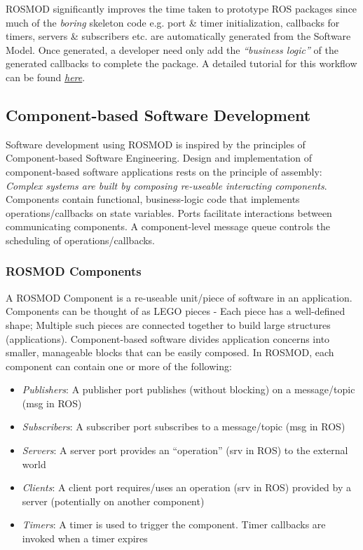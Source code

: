 \documentclass[letterpaper,10pt,english]{sphinxmanual}
\begin{document}
ROSMOD significantly improves the time taken to prototype ROS packages since much of the \emph{boring} skeleton code e.g. port \& timer initialization, callbacks for timers, servers \& subscribers etc. are automatically generated from the Software Model. Once generated, a developer need only add the \emph{``business logic''} of the generated callbacks to complete the package. A detailed tutorial for this workflow can be found {\hyperref[Tutorial:id1]{\emph{here}}}.


\subsection{Component-based Software Development}
\label{Introduction:component-based-software-development}
Software development using ROSMOD is inspired by the principles of Component-based Software Engineering. Design and implementation of component-based software applications rests on the principle of assembly: \emph{Complex systems are built by composing re-useable interacting components}. Components contain functional, business-logic code that implements operations/callbacks on state variables. Ports facilitate interactions between communicating components. A component-level message queue controls the scheduling of operations/callbacks.


\subsubsection{ROSMOD Components}
\label{Introduction:rosmod-components}
A ROSMOD Component is a re-useable unit/piece of software in an application. Components can be thought of as LEGO pieces - Each piece has a well-defined shape; Multiple such pieces are connected together to build large structures (applications). Component-based software divides application concerns into smaller, manageable blocks that can be easily composed. In ROSMOD, each component can contain one or more of the following:
\begin{itemize}
\item {} 
\emph{Publishers}: A publisher port publishes (without blocking) on a message/topic (msg in ROS)

\item {} 
\emph{Subscribers}: A subscriber port subscribes to a message/topic (msg in ROS)

\item {} 
\emph{Servers}: A server port provides an ``operation'' (srv in ROS) to the external world

\item {} 
\emph{Clients}: A client port requires/uses an operation (srv in ROS) provided by a server (potentially on another component)

\item {} 
\emph{Timers}: A timer is used to trigger the component. Timer callbacks are invoked when a timer expires

\end{itemize}
\end{document}

